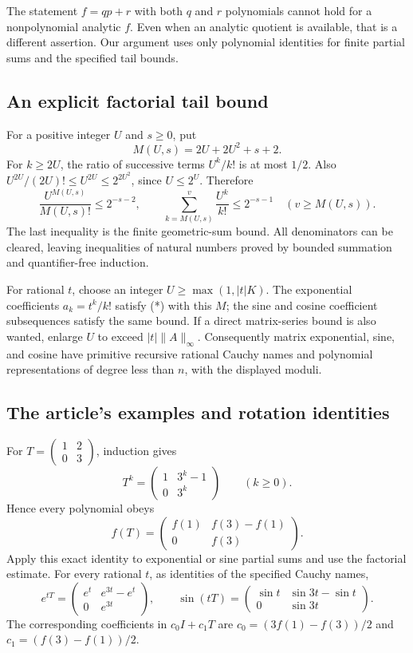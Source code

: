 The statement $f=qp+r$ with both $q$ and $r$ polynomials cannot hold
for a nonpolynomial analytic $f$. Even when an analytic quotient is
available, that is a different assertion. Our argument uses only
polynomial identities for finite partial sums and the specified tail
bounds.

\subsection{An explicit factorial tail bound}

For a positive integer $U$ and $s\geq0$, put
\[
 M(U,s)=2U+2U^2+s+2.
\]
For $k\geq2U$, the ratio of successive terms $U^k/k!$ is at most
$1/2$. Also $U^{2U}/(2U)!\leq U^{2U}\leq2^{2U^2}$, since
$U\leq2^U$. Therefore
\[
 \frac{U^{M(U,s)}}{M(U,s)!}\leq2^{-s-2},\qquad
 \sum_{k=M(U,s)}^v\frac{U^k}{k!}\leq2^{-s-1}
 \quad(v\geq M(U,s)).
\]
The last inequality is the finite geometric-sum bound. All denominators
can be cleared, leaving inequalities of natural numbers proved by
bounded summation and quantifier-free induction.

For rational $t$, choose an integer $U\geq\max(1,|t|K)$.
The exponential coefficients $a_k=t^k/k!$ satisfy (*) with this $M$;
the sine and cosine coefficient subsequences satisfy the same bound.
If a direct matrix-series bound is also wanted, enlarge $U$ to exceed
$|t|\|A\|_\infty$. Consequently matrix exponential, sine, and cosine
have primitive recursive rational Cauchy names and polynomial
representations of degree less than $n$, with the displayed moduli.

\subsection{The article's examples and rotation identities}

For $T=\left(\begin{smallmatrix}1&2\\0&3\end{smallmatrix}\right)$,
induction gives
\[
 T^k=\begin{pmatrix}1&3^k-1\\0&3^k\end{pmatrix}\qquad(k\geq0).
\]
Hence every polynomial obeys
\[
 f(T)=\begin{pmatrix}f(1)&f(3)-f(1)\\0&f(3)\end{pmatrix}.
\]
Apply this exact identity to exponential or sine partial sums and use
the factorial estimate. For every rational $t$, as identities of the
specified Cauchy names,
\[
 e^{tT}=\begin{pmatrix}e^t&e^{3t}-e^t\\0&e^{3t}\end{pmatrix},\qquad
 \sin(tT)=\begin{pmatrix}\sin t&\sin3t-\sin t\\0&\sin3t\end{pmatrix}.
\]
The corresponding coefficients in $c_0I+c_1T$ are
$c_0=(3f(1)-f(3))/2$ and $c_1=(f(3)-f(1))/2$.

